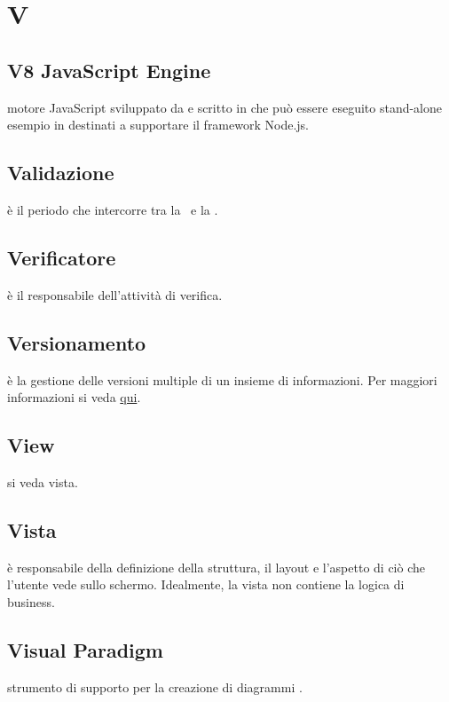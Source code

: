 \documentclass[12pt,a4paper]{article}
\begin{document}
\newpage

\section{V}


\subsection{V8 JavaScript Engine} 
motore JavaScript  sviluppato da  e scritto in  che  può essere eseguito stand-alone esempio in  destinati a supportare il framework Node.js.

\subsection{Validazione} 
è il periodo che intercorre tra la \RQ\ e la \RA.

\subsection{Verificatore} 
è il responsabile dell'attività di verifica.

\subsection{Versionamento} 
è la gestione delle versioni multiple di un insieme di informazioni. Per maggiori informazioni si veda \href{http://it. wikipedia.org/wiki/Controllo_versione}{qui}.

\subsection{View} 
si veda vista.

\subsection{Vista} 
è responsabile della definizione della struttura, il layout e l'aspetto di ciò che l'utente vede sullo schermo. Idealmente, la vista non contiene la logica di business.

\subsection{Visual Paradigm} 
strumento di supporto per la creazione di diagrammi .


\newpage
\end{document}
